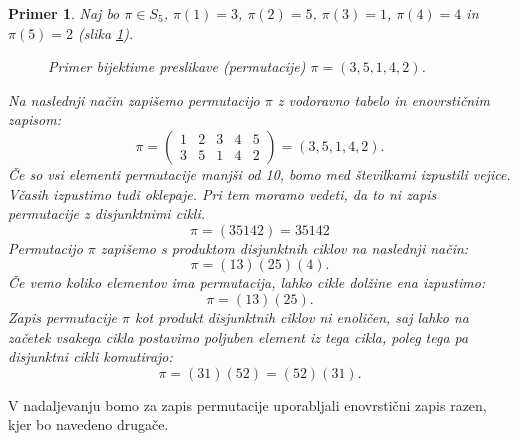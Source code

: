 \documentclass[a4paper, 12pt]{book}
\newtheorem{primer}{Primer}[chapter]
\begin{document}
\begin{primer}
    Naj bo $\pi \in S_5$, $\pi(1) = 3$, $\pi(2) = 5$, $\pi(3) = 1$, $\pi(4) = 4$ in $\pi(5) = 2$ (slika \ref{bijektivna_preslikava_n_n}). 
    \begin{figure}[h]
        \begin{center}        
        \end{center}
        \caption{Primer bijektivne preslikave (permutacije) $\pi = (3, 5, 1, 4, 2)$.}
        \label{bijektivna_preslikava_n_n}
    \end{figure}
    Na naslednji način zapišemo permutacijo $\pi$ z vodoravno tabelo in enovrstičnim zapisom:
    \[
        \pi = \begin{pmatrix}
            1 & 2 & 3 & 4 & 5 \\
            3 & 5 & 1 & 4 & 2
        \end{pmatrix} = (3, 5, 1, 4, 2).
    \]
    Če so vsi elementi permutacije manjši od 10, bomo med številkami izpustili vejice. Včasih izpustimo tudi oklepaje. Pri tem moramo vedeti, da to ni zapis permutacije z disjunktnimi cikli.
    \[
        \pi = (3 5 1 4 2) = 35142
    \]
    Permutacijo $\pi$ zapišemo s produktom disjunktnih ciklov na naslednji način:
    \[
        \pi = (1 3)(2 5)(4).
    \]
    Če vemo koliko elementov ima permutacija, lahko cikle dolžine ena izpustimo: 
    \[
        \pi = (1 3)(2 5).
    \]
    Zapis permutacije $\pi$ kot produkt disjunktnih ciklov ni enoličen, saj lahko na začetek vsakega cikla postavimo poljuben element iz tega cikla, poleg tega pa disjunktni cikli komutirajo:
    \[
        \pi = (3 1)(5 2) = (5 2)(3 1).
    \]
\end{primer}

V nadaljevanju bomo za zapis permutacije uporabljali enovrstični zapis razen, kjer bo navedeno drugače.
\end{document}
